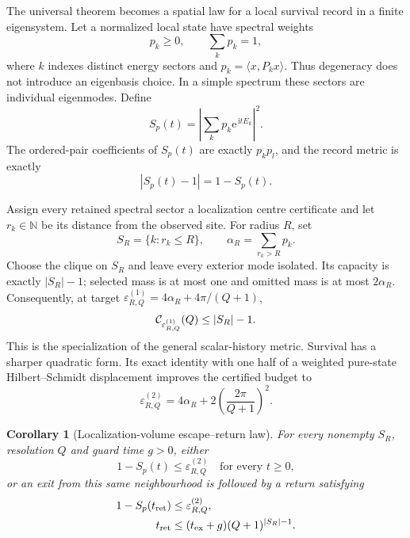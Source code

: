 \documentclass[10pt]{article}
\newtheorem{corollary}[theorem]{Corollary}
\theoremstyle{definition}
\newcommand{\N}{\mathbb N}
\newcommand{\ee}{\mathrm e}
\begin{document}
The universal theorem becomes a spatial law for a local survival record in
a finite eigensystem. Let a normalized local state have spectral weights
\[
 p_k\geq0,\qquad \sum_kp_k=1,
\]
where \(k\) indexes distinct energy sectors and
\(p_k=\langle x,P_kx\rangle\). Thus degeneracy does not introduce an
eigenbasis choice. In a simple spectrum these sectors are individual
eigenmodes. Define
\begin{equation}
 S_p(t)=\left|\sum_kp_k\ee^{\,\mathrm i tE_k}\right|^2.
 \label{eq:survival}
\end{equation}
The ordered-pair coefficients of \(S_p(t)\) are exactly \(p_kp_l\), and the
record metric is exactly
\[
 |S_p(t)-1|=1-S_p(t).
\]

Assign every retained spectral sector a localization centre certificate and
let \(r_k\in\N\) be its distance from the observed site. For radius \(R\), set
\[
 S_R=\{k:r_k\leq R\},\qquad
 \alpha_R=\sum_{r_k>R}p_k.
\]
Choose the clique on \(S_R\) and leave every exterior mode isolated. Its
capacity is exactly \(|S_R|-1\); selected mass is at most one and omitted
mass is at most \(2\alpha_R\). Consequently, at target
\(\varepsilon^{(1)}_{R,Q}=4\alpha_R+4\pi/(Q+1)\),
\begin{equation}
 {\cal C}_{\varepsilon^{(1)}_{R,Q}}(Q)\le |S_R|-1.
 \label{eq:localized-capacity}
\end{equation}
This is the specialization of the general scalar-history metric. Survival
has a sharper quadratic form. Its exact identity with one half of a
weighted pure-state Hilbert--Schmidt displacement improves the certified
budget to
\begin{equation}
 \varepsilon^{(2)}_{R,Q}=
 4\alpha_R+2\left(\frac{2\pi}{Q+1}\right)^2.
 \label{eq:localized-quadratic-budget}
\end{equation}

\begin{corollary}[Localization-volume escape--return law]
\label{cor:localized}
For every nonempty \(S_R\), resolution \(Q\) and guard time \(g>0\), either
\[
  1-S_p(t)\le\varepsilon^{(2)}_{R,Q}
  \quad\text{for every }t\ge0,
 \label{eq:localized-never}
\]
or an exit from this same neighbourhood is followed by a return satisfying
\begin{align}
  1-S_p(t_{\rm ret})
    &\le\varepsilon^{(2)}_{R,Q},\label{eq:localized-error}\\
  t_{\rm ret}
    &\le(t_{\rm ex}+g)(Q+1)^{|S_R|-1}.
 \label{eq:localized-deadline}
\end{align}
\end{corollary}
\end{document}
